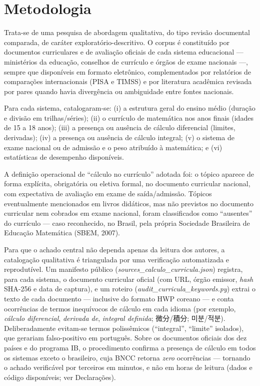 \documentclass[12pt,a4paper,oneside]{article}
\begin{document}
\section{Metodologia}
\label{sec:metodo}

Trata-se de uma pesquisa de abordagem qualitativa, do tipo revisão
documental comparada, de caráter exploratório-descritivo. O corpus é
constituído por documentos curriculares e de avaliação oficiais de cada
sistema educacional --- ministérios da educação, conselhos de currículo e
órgãos de exame nacionais ---, sempre que disponíveis em formato
eletrônico, complementados por relatórios de comparações internacionais
(PISA e TIMSS) e por literatura acadêmica revisada por pares quando havia
divergência ou ambiguidade entre fontes nacionais.

Para cada sistema, catalogaram-se: (i) a estrutura geral do ensino médio
(duração e divisão em trilhas/séries); (ii) o currículo de matemática nos
anos finais (idades de 15 a 18 anos); (iii) a presença ou ausência de
cálculo diferencial (limites, derivadas); (iv) a presença ou ausência de
cálculo integral; (v) o sistema de exame nacional ou de admissão e o peso
atribuído à matemática; e (vi) estatísticas de desempenho disponíveis.

A definição operacional de ``cálculo no currículo'' adotada foi: o tópico
aparece de forma explícita, obrigatória ou eletiva formal, no documento
curricular nacional, com expectativa de avaliação em exame de
saída/admissão. Tópicos eventualmente mencionados em livros didáticos,
mas não previstos no documento curricular nem cobrados em exame nacional,
foram classificados como ``ausentes'' do currículo --- caso reconhecido,
no Brasil, pela própria Sociedade Brasileira de Educação Matemática
(SBEM, 2007).

Para que o achado central não dependa apenas da leitura dos autores, a
catalogação qualitativa é triangulada por uma verificação automatizada e
reprodutível. Um manifesto público (\emph{sources\_calculo\_curricula.json})
registra, para cada sistema, o documento curricular oficial (com URL, órgão
emissor, \emph{hash} SHA-256 e data de captura), e um roteiro
(\emph{audit\_curricula\_keywords.py}) extrai o texto de cada documento
--- inclusive do formato HWP coreano --- e conta ocorrências de termos
inequívocos de cálculo em cada idioma (por exemplo, \emph{cálculo
diferencial}, \emph{derivada de}, \emph{integral definida}; 微分/積分;
미분/적분). Deliberadamente evitam-se termos polissêmicos (``integral'',
``limite'' isolados), que gerariam falso-positivo em português. Sobre os
documentos oficiais dos dez países e do programa IB, o procedimento
confirma a presença de cálculo em todos os sistemas exceto o brasileiro,
cuja BNCC retorna \emph{zero} ocorrências --- tornando o achado verificável
por terceiros em minutos, e não em horas de leitura (dados e código
disponíveis; ver Declarações).
\end{document}
